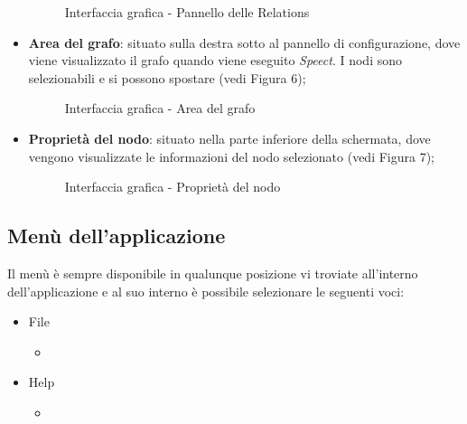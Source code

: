 \documentclass[openany,12pt,a4paper]{report}
\begin{document}
\begin{itemize}
\begin{figure}[H]
 			\centering
 			
 			
 			\caption{Interfaccia grafica - Pannello delle Relations}
 			
 		\end{figure}
 	
 		\item \textbf{Area del grafo}: situato sulla destra sotto al pannello di configurazione, dove viene visualizzato il grafo quando viene eseguito \textit{Speect}. I nodi sono selezionabili e si possono spostare (vedi Figura 6);
 		\begin{figure}[H]
 			
 			\centering
 			
 			
 			\caption{Interfaccia grafica - Area del grafo}
 			
 		\end{figure}
 	
 		\item \textbf{Proprietà del nodo}: situato nella parte inferiore della schermata, dove vengono visualizzate le informazioni del nodo selezionato (vedi Figura 7);
 		\begin{figure}[H]
 			
 			\centering
 			
 			
 			\caption{Interfaccia grafica - Proprietà del nodo}
 			
 		\end{figure}
 		
 	\end{itemize}
	
	\subsection{Menù dell'applicazione}
	Il menù è sempre disponibile in qualunque posizione vi troviate all'interno dell'applicazione e al suo interno è possibile selezionare le seguenti voci:
	\begin{itemize}
		\item File 
			\begin{itemize}
				\item 
			\end{itemize}
		\item Help
			\begin{itemize}
				\item 
			\end{itemize}
	\end{itemize}
	
\end{document}
